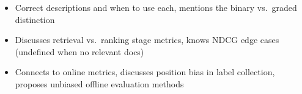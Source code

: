 \begin{interviewq}
\goodgreat
\begin{itemize}
    \item {} Correct descriptions and when to use each, mentions the binary vs.\ graded distinction
    \item {} Discusses retrieval vs.\ ranking stage metrics, knows NDCG edge cases (undefined when no relevant docs)
    \item {} Connects to online metrics, discusses position bias in label collection, proposes unbiased offline evaluation methods
\end{itemize}

\end{interviewq}

